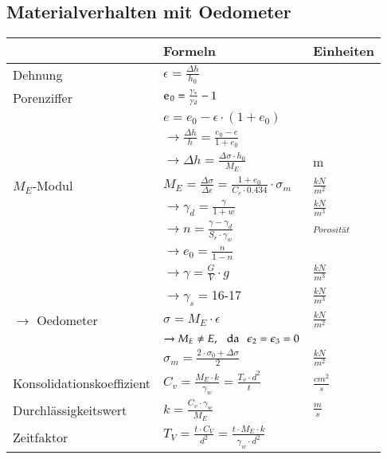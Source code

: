 \begin{minipage}[t]{0.5\linewidth}
	\subsection{Materialverhalten mit Oedometer}

	\begin{tabular}{l|l|l}
				& Formeln 									& Einheiten \\ \hline \hline
	
		Dehnung &$\epsilon = \frac{\Delta h}{h_0}$& \\ \hline
	
		Porenziffer&$\e_0=\frac{\gamma_s}{\gamma_d} -1$		& \\
				&$e=e_0-\epsilon \cdot \left(1+ e_0\right)$	&\\
				&$\rightarrow\frac{\Delta h}{h}=\frac{e_0 - e}{1+e_0}$&\\	
				&$\rightarrow\Delta h=\frac{\Delta \sigma \cdot h_0}{M_E}$&m \\ \hline
	
		$M_E$-Modul&$M_E=\frac{\Delta \sigma}{\Delta \epsilon}=\frac{1+e_0}{C_c \cdot 0.434}\cdot\sigma_m$&$\frac{kN}{m^2}$ \\	
				&$\rightarrow \gamma_d=\frac{\gamma}{1+w}$	&$\frac{kN}{m^3}$ \\
				&$\rightarrow n=\frac{\gamma-\gamma_d}{S_r\cdot\gamma_w}$&  $_{Porosität}$ \\
				&$\rightarrow e_0=\frac{n}{1-n}$			& \\
				&$\rightarrow \gamma=\frac{G}{V}\cdot g$	& $\frac{kN}{m^3}$ \\
				&$\rightarrow \gamma_s=$16-17				& $\frac{kN}{m^3}$ \\ \hline

		$\rightarrow$ Oedometer&$\sigma=M_E \cdot \epsilon$ &$\frac{kN}{m^2}$ \\
				&$\rightarrow M_E\neq E, \hspace{0.25cm}\text{da} \hspace{.25cm} \epsilon_2=\epsilon_3=0$& \\
				&$\sigma_m=\frac{2\cdot\sigma_0+\Delta \sigma}{2}$&$\frac{kN}{m^2}$ \\ \hline

		Konsolidationskoeffizient&$C_v=\frac{M_E\cdot k}{\gamma_w}=\frac{T_v\cdot d^2}{t}$&$\frac{cm^2}{s}$ \\ \hline

		Durchlässigkeitswert&$k=\frac{C_v\cdot\gamma_w}{M_E}$& $\frac{m}{s}$ \\ \hline
		Zeitfaktor&$T_V=\frac{t\cdot C_V}{d^2}=\frac{t\cdot M_E\cdot k}{\gamma_w\cdot d^2}$& \\ \hline
	

\end{tabular}
\end{minipage}
